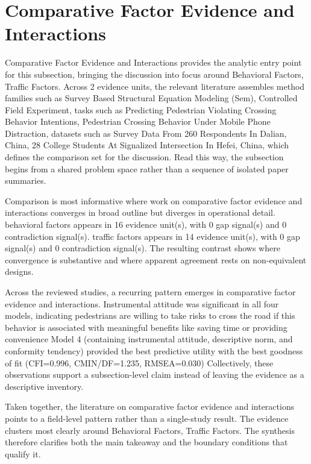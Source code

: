 \documentclass{article}
\begin{document}
\section{Comparative Factor Evidence and Interactions}
Comparative Factor Evidence and Interactions provides the analytic entry point for this subsection, bringing the discussion into focus around Behavioral Factors, Traffic Factors. Across 2 evidence units, the relevant literature assembles method families such as Survey Based Structural Equation Modeling (Sem), Controlled Field Experiment, tasks such as Predicting Pedestrian Violating Crossing Behavior Intentions, Pedestrian Crossing Behavior Under Mobile Phone Distraction, datasets such as Survey Data From 260 Respondents In Dalian, China, 28 College Students At Signalized Intersection In Hefei, China, which defines the comparison set for the discussion. Read this way, the subsection begins from a shared problem space rather than a sequence of isolated paper summaries. \cite{08_2016_zhou_aap,09_2018_jiang_aap}

Comparison is most informative where work on comparative factor evidence and interactions converges in broad outline but diverges in operational detail. behavioral factors appears in 16 evidence unit(s), with 0 gap signal(s) and 0 contradiction signal(s). traffic factors appears in 14 evidence unit(s), with 0 gap signal(s) and 0 contradiction signal(s). The resulting contrast shows where convergence is substantive and where apparent agreement rests on non-equivalent designs. \cite{08_2016_zhou_aap,09_2018_jiang_aap}

Across the reviewed studies, a recurring pattern emerges in comparative factor evidence and interactions. Instrumental attitude was significant in all four models, indicating pedestrians are willing to take risks to cross the road if this behavior is associated with meaningful benefits like saving time or providing convenience Model 4 (containing instrumental attitude, descriptive norm, and conformity tendency) provided the best predictive utility with the best goodness of fit (CFI=0.996, CMIN/DF=1.235, RMSEA=0.030) Collectively, these observations support a subsection-level claim instead of leaving the evidence as a descriptive inventory. \cite{08_2016_zhou_aap,09_2018_jiang_aap}

Taken together, the literature on comparative factor evidence and interactions points to a field-level pattern rather than a single-study result. The evidence clusters most clearly around Behavioral Factors, Traffic Factors. The synthesis therefore clarifies both the main takeaway and the boundary conditions that qualify it. \cite{08_2016_zhou_aap,09_2018_jiang_aap}
\end{document}
